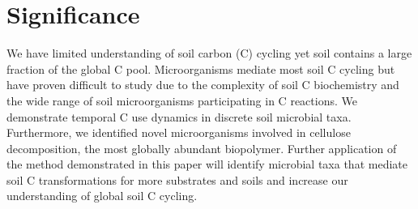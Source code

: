 \section{Significance} 
We have limited understanding of soil carbon (C) cycling yet soil contains
a large fraction of the global C pool. Microorganisms mediate most soil
C cycling but have proven difficult to study due to the complexity of soil
C biochemistry and the wide range of soil microorganisms participating in C reactions.
We demonstrate temporal C use dynamics in discrete soil microbial taxa. 
Furthermore, we identified novel microorganisms involved in cellulose
decomposition, the most globally abundant biopolymer. Further application of the
method demonstrated in this paper will identify microbial taxa that
mediate soil C transformations for more substrates and soils and increase our
understanding of global soil C cycling. 

